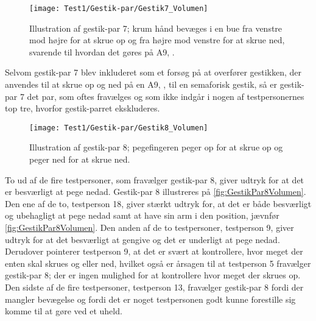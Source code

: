%
\begin{figure}[H]
	\centering
	\texttt{[image: Test1/Gestik-par/Gestik7\_Volumen]}
	\caption{Illustration af gestik-par 7; krum hånd bevæges i en bue fra venstre mod højre for at skrue op og fra højre mod venstre for at skrue ned, svarende til hvordan det gøres på A9, \parencite{WEB:BeoplayA9}.}
	\label{fig:GestikPar7Volumen}
\end{figure}
\noindent
%
Selvom gestik-par 7 blev inkluderet som et forsøg på at overfører gestikken, der anvendes til at skrue op og ned på en A9, \parencite{WEB:BeoplayA9}, til en semaforisk gestik, så er gestik-par 7 det par, som oftes fravælges og som ikke indgår i nogen af testpersonernes top tre, hvorfor gestik-parret ekskluderes.
%
\begin{figure}[H]
	\centering
	\texttt{[image: Test1/Gestik-par/Gestik8\_Volumen]}
	\caption{Illustration af gestik-par 8; pegefingeren peger op for at skrue op og peger ned for at skrue ned.}
	\label{fig:GestikPar8Volumen}
\end{figure}
\noindent
%
To ud af de fire testpersoner, som fravælger gestik-par 8, giver udtryk for at det er besværligt at pege nedad. Gestik-par 8 illustreres på \autoref{fig:GestikPar8Volumen}. Den ene af de to, testperson 18, giver stærkt udtryk for, at det er både besværligt og ubehagligt at pege nedad samt at have sin arm i den position, jævnfør \autoref{fig:GestikPar8Volumen}. Den anden af de to testpersoner, testperson 9, giver udtryk for at det besværligt at gengive og det er underligt at pege nedad. Derudover pointerer testperson 9, at det er svært at kontrollere, hvor meget der enten skal skrues og eller ned, hvilket også er årsagen til at testperson 5 fravælger gestik-par 8; der er ingen mulighed for at kontrollere hvor meget der skrues op. Den sidste af de fire testpersoner, testperson 13, fravælger gestik-par 8 fordi der mangler bevægelse og fordi det er noget testpersonen godt kunne forestille sig komme til at gøre ved et uheld. \blankline 
%
